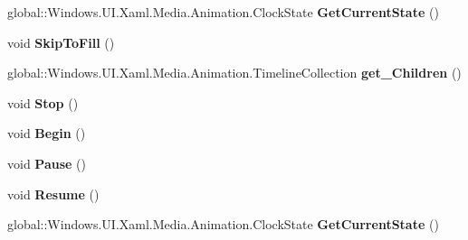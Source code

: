\begin{DoxyCompactItemize}
global\+::\+Windows.\+U\+I.\+Xaml.\+Media.\+Animation.\+Clock\+State {\bfseries Get\+Current\+State} ()
\item 
\mbox{\label{interface_windows_1_1_u_i_1_1_xaml_1_1_media_1_1_animation_1_1_i_storyboard_a2e94db3f45b7a46b539a78a132a85d7e}} 
void {\bfseries Skip\+To\+Fill} ()
\item 
\mbox{\label{interface_windows_1_1_u_i_1_1_xaml_1_1_media_1_1_animation_1_1_i_storyboard_a4d9df632c9aa2afcb3d619dcbb357776}} 
global\+::\+Windows.\+U\+I.\+Xaml.\+Media.\+Animation.\+Timeline\+Collection {\bfseries get\+\_\+\+Children} ()
\item 
\mbox{\label{interface_windows_1_1_u_i_1_1_xaml_1_1_media_1_1_animation_1_1_i_storyboard_acdc53aada6a43b3d82536e1968449961}} 
void {\bfseries Stop} ()
\item 
\mbox{\label{interface_windows_1_1_u_i_1_1_xaml_1_1_media_1_1_animation_1_1_i_storyboard_acecbf19b19efcd680ab801ea7583213d}} 
void {\bfseries Begin} ()
\item 
\mbox{\label{interface_windows_1_1_u_i_1_1_xaml_1_1_media_1_1_animation_1_1_i_storyboard_ab6962da9d22e4e6074b1b55d16e501c6}} 
void {\bfseries Pause} ()
\item 
\mbox{\label{interface_windows_1_1_u_i_1_1_xaml_1_1_media_1_1_animation_1_1_i_storyboard_ac730df45ba536de8f998a9a99c6995d6}} 
void {\bfseries Resume} ()
\item 
\mbox{\label{interface_windows_1_1_u_i_1_1_xaml_1_1_media_1_1_animation_1_1_i_storyboard_a921af38756f68389523f29696421dc20}} 
global\+::\+Windows.\+U\+I.\+Xaml.\+Media.\+Animation.\+Clock\+State {\bfseries Get\+Current\+State} ()
\item 
\mbox{\label{interface_windows_1_1_u_i_1_1_xaml_1_1_media_1_1_animation_1_1_i_storyboard_a2e94db3f45b7a46b539a78a132a85d7e}} 

\end{DoxyCompactItemize}
